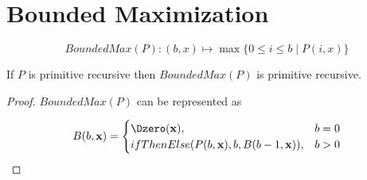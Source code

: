 \section{Bounded Maximization}

\begin{definition}
$$BoundedMax(P): (b,x) \mapsto \max \{0 \le i \le b \mid P(i,x)\}$$
\end{definition}

\begin{theorem}
If $P$ is primitive recursive then $BoundedMax(P)$ is primitive
recursive.
\end{theorem}

\begin{proof}
$BoundedMax(P)$ can be represented as

$$
B(b,\mathbf{x}) = 
\begin{cases} \Dzero(\mathbf{x}), & b = 0\\
ifThenElse(P(b,\mathbf{x}),b,B(b-1, \mathbf{x})), &b > 0 
\end{cases}
$$
\end{proof}
